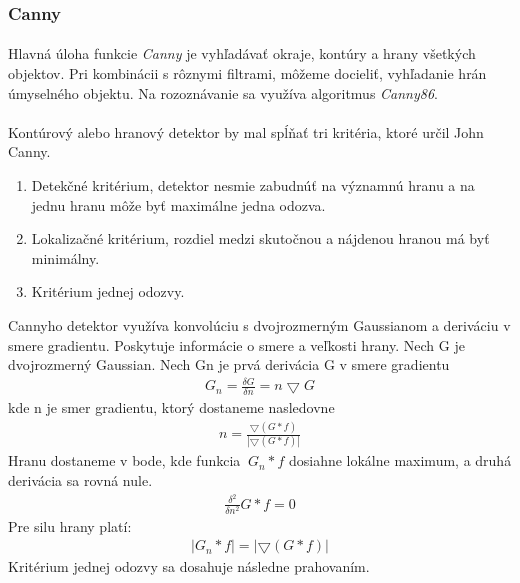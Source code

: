 \documentclass[12pt]{article}
\begin{document}
\subsubsection{Canny}
\paragraph{}
Hlavná úloha funkcie \emph{Canny} je vyhľadávať okraje, kontúry a hrany všetkých objektov. Pri kombinácii s rôznymi filtrami, môžeme docieliť, vyhľadanie hrán úmyselného objektu.
Na rozoznávanie sa využíva algoritmus \emph{Canny86}.
\cite{canny}
\cite{OpenCVDoc}
\paragraph{}
Kontúrový alebo hranový detektor by mal spĺňať tri kritéria, ktoré určil John Canny.
\begin{enumerate}
  \item Detekčné kritérium, detektor nesmie zabudnúť na významnú hranu a na jednu hranu môže byť maximálne jedna odozva.
  \item Lokalizačné kritérium, rozdiel medzi skutočnou a nájdenou hranou má byť minimálny.
  \item Kritérium jednej odozvy.
\end{enumerate}
Cannyho detektor využíva konvolúciu s dvojrozmerným Gaussianom a deriváciu v smere gradientu.
Poskytuje informácie o smere a veľkosti hrany. Nech G je dvojrozmerný Gaussian. Nech Gn je prvá derivácia G v smere gradientu
\begin{align*}
G_n = \frac{\delta G}{\delta n} = n\bigtriangledown G
\end{align*}
kde n je smer gradientu, ktorý dostaneme nasledovne
\begin{align*}
n = \frac{\bigtriangledown(G * f)}{|\bigtriangledown(G * f)|}
\end{align*}
Hranu dostaneme v bode, kde funkcia \begin{math}\ G_n *f  \end{math} dosiahne lokálne maximum, a druhá derivácia sa rovná nule.
\begin{align*}
\frac{\delta^2}{\delta n^2} G * f = 0
\end{align*}
Pre silu hrany platí:
\begin{align*}
|G_n * f| = |\bigtriangledown (G * f)|
\end{align*}
Kritérium jednej odozvy sa dosahuje následne prahovaním. 
\cite{DIP}
\cite{JCanny}
\cite{canny_wiki_en}
\end{document}
